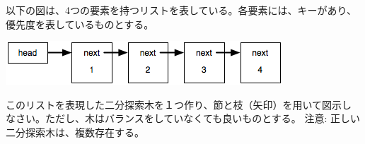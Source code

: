 \documentclass[a4j,9pt]{jsarticle}
\begin{document}
\begin{screen}
以下の図は、4つの要素を持つリストを表している。各要素には、キーがあり、
 優先度を表しているものとする。
\begin{center}
\vspace{1zh}
\includegraphics[scale=0.5]{proc-list-next.png} 
\vspace{1zh}
\end{center}
このリストを表現した二分探索木を１つ作り、節と枝（矢印）を用いて図示し なさい。ただし、木はバランスをしていなくても良いものとする。
注意: 正しい二分探索木は、複数存在する。
\end{screen}
\end{document}
